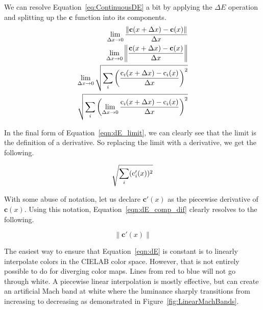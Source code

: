 \documentclass[review,journal]{vgtc}         %
\newcommand{\Lab}{CIELAB\xspace}
\newcommand{\DeltaE}{\ensuremath{\Delta{}E}\xspace}
\newcommand*{\cvec}[1]{\mathbf{#1}}
\begin{document}
We can resolve Equation~\ref{eq:ContinuousDE} a bit by applying the \DeltaE
operation and splitting up the $\cvec{c}$ function into its components.
\begin{equation}
  \begin{split}
    { \lim_{\Delta x \rightarrow 0}
      \frac{\left\lVert \cvec{c}(x+\Delta x) - \cvec{c}(x) \right\rVert}
      {\Delta x}} \\
    { \lim_{\Delta x \rightarrow 0}
      \left\lVert \frac{\cvec{c}(x+\Delta x)- \cvec{c}(x)}
	  {\Delta x} \right\rVert } \\
    { \lim_{\Delta x \rightarrow 0}
      \sqrtsign{ \sum_i \left( \frac
	  {\operatorname{c}_i(x+\Delta x)
	    - \operatorname{c}_i(x)}
	  {\Delta x} \right)^2 } } \\
    {\sqrtsign{ \sum_i \left( \lim_{\Delta x \rightarrow 0}
       \frac
	  {\operatorname{c}_i(x+\Delta x)
	    - \operatorname{c}_i(x)}
	  {\Delta x} \right)^2 } }
  \end{split}
  \label{eqn:dE_limit}
\end{equation}

In the final form of Equation~\ref{eqn:dE_limit}, we can clearly see that
the limit is the definition of a derivative.  So replacing the limit with a
derivative, we get the following.

\begin{equation}
  \sqrtsign{\sum_i (\operatorname{c}_{i}'(x))^2}
  \label{eqn:dE_comp_dif}
\end{equation}

With some abuse of notation, let us declare $\cvec{c}'(x)$ as the piecewise
derivative of $\cvec{c}(x)$.  Using this notation,
Equation~\ref{eqn:dE_comp_dif} clearly resolves to the following.

\begin{equation}
  \left\lVert \cvec{c}'(x) \right\rVert
  \label{eqn:dE}
\end{equation}

The easiest way to ensure that Equation~\ref{eqn:dE} is constant
is to linearly interpolate colors in the \Lab color space.  However, that
is not entirely possible to do for diverging color maps.  Lines from red to
blue will not go through white.  A piecewise linear interpolation is mostly
effective, but can create an artificial Mach band at white where the
luminance sharply transitions from increasing to decreasing as demonstrated
in Figure~\ref{fig:LinearMachBands}.
\end{document}
